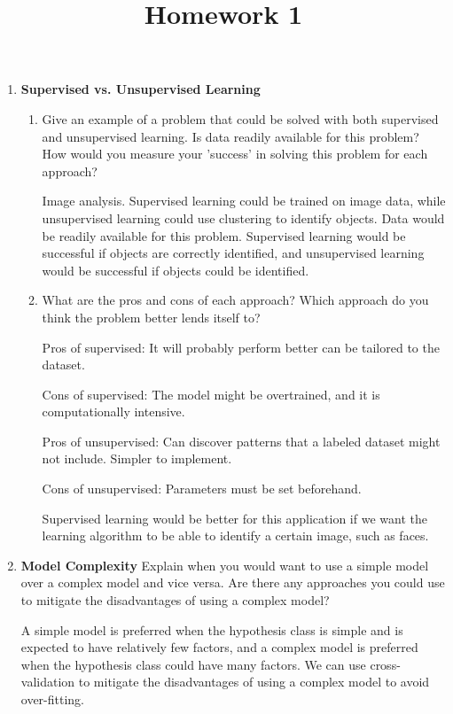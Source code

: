\documentclass{article}
\begin{document}
\title{Homework 1}
\maketitle
\thispagestyle{fancy}

\begin{enumerate}[1)]
	\item \textbf{Supervised vs. Unsupervised Learning}
		\begin{enumerate}[1.]
			\item Give an example of a problem that could be solved with both supervised and unsupervised learning. Is data readily available for this problem? How would you measure your 'success' in solving this problem for each approach?
				\begin{answer*}
					Image analysis. Supervised learning could be trained on image data, while unsupervised learning could use clustering to identify objects. Data would be readily available for this problem. Supervised learning would be successful if objects are correctly identified, and unsupervised learning would be successful if objects could be identified.
				\end{answer*}

			\item What are the pros and cons of each approach? Which approach do you think the problem better lends itself to?
				\begin{answer*}
					Pros of supervised: It will probably perform better can be tailored to the dataset.

					Cons of supervised: The model might be overtrained, and it is computationally intensive.

					Pros of unsupervised: Can discover patterns that a labeled dataset might not include. Simpler to implement.

					Cons of unsupervised: Parameters must be set beforehand. 

					Supervised learning would be better for this application if we want the learning algorithm to be able to identify a certain image, such as faces. 
				\end{answer*}
				
		\end{enumerate}

		\newpage
	\item \textbf{Model Complexity} Explain when you would want to use a simple model over a complex model and vice versa. Are there any approaches you could use to mitigate the disadvantages of using a complex model?
		\begin{answer*}
			A simple model is preferred when the hypothesis class is simple and is expected to have relatively few factors, and a complex model is preferred when the hypothesis class could have many factors. We can use cross-validation to mitigate the disadvantages of using a complex model to avoid over-fitting.
		\end{answer*}


\end{enumerate}
\end{document}
